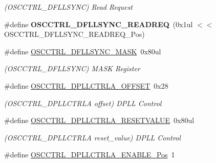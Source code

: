 \begin{DoxyCompactItemize}
\begin{DoxyCompactList}\small\item\em (O\+S\+C\+C\+T\+R\+L\+\_\+\+D\+F\+L\+L\+S\+Y\+N\+C) Read Request \end{DoxyCompactList}\item 
\hypertarget{group___s_a_m_l21___o_s_c_c_t_r_l_ga199b69336fb216ba83faebf331a55239}{}\#define {\bfseries O\+S\+C\+C\+T\+R\+L\+\_\+\+D\+F\+L\+L\+S\+Y\+N\+C\+\_\+\+R\+E\+A\+D\+R\+E\+Q}~(0x1ul $<$$<$ O\+S\+C\+C\+T\+R\+L\+\_\+\+D\+F\+L\+L\+S\+Y\+N\+C\+\_\+\+R\+E\+A\+D\+R\+E\+Q\+\_\+\+Pos)\label{group___s_a_m_l21___o_s_c_c_t_r_l_ga199b69336fb216ba83faebf331a55239}

\item 
\hypertarget{group___s_a_m_l21___o_s_c_c_t_r_l_gafd97d4fa228e779e98b8706cd34934c2}{}\#define \hyperlink{group___s_a_m_l21___o_s_c_c_t_r_l_gafd97d4fa228e779e98b8706cd34934c2}{O\+S\+C\+C\+T\+R\+L\+\_\+\+D\+F\+L\+L\+S\+Y\+N\+C\+\_\+\+M\+A\+S\+K}~0x80ul\label{group___s_a_m_l21___o_s_c_c_t_r_l_gafd97d4fa228e779e98b8706cd34934c2}

\begin{DoxyCompactList}\small\item\em (O\+S\+C\+C\+T\+R\+L\+\_\+\+D\+F\+L\+L\+S\+Y\+N\+C) M\+A\+S\+K Register \end{DoxyCompactList}\item 
\hypertarget{group___s_a_m_l21___o_s_c_c_t_r_l_ga37a4733b04ee101902f2512b99059cd5}{}\#define \hyperlink{group___s_a_m_l21___o_s_c_c_t_r_l_ga37a4733b04ee101902f2512b99059cd5}{O\+S\+C\+C\+T\+R\+L\+\_\+\+D\+P\+L\+L\+C\+T\+R\+L\+A\+\_\+\+O\+F\+F\+S\+E\+T}~0x28\label{group___s_a_m_l21___o_s_c_c_t_r_l_ga37a4733b04ee101902f2512b99059cd5}

\begin{DoxyCompactList}\small\item\em (O\+S\+C\+C\+T\+R\+L\+\_\+\+D\+P\+L\+L\+C\+T\+R\+L\+A offset) D\+P\+L\+L Control \end{DoxyCompactList}\item 
\hypertarget{group___s_a_m_l21___o_s_c_c_t_r_l_ga1753de286cb86ad6e147893f3413bd61}{}\#define \hyperlink{group___s_a_m_l21___o_s_c_c_t_r_l_ga1753de286cb86ad6e147893f3413bd61}{O\+S\+C\+C\+T\+R\+L\+\_\+\+D\+P\+L\+L\+C\+T\+R\+L\+A\+\_\+\+R\+E\+S\+E\+T\+V\+A\+L\+U\+E}~0x80ul\label{group___s_a_m_l21___o_s_c_c_t_r_l_ga1753de286cb86ad6e147893f3413bd61}

\begin{DoxyCompactList}\small\item\em (O\+S\+C\+C\+T\+R\+L\+\_\+\+D\+P\+L\+L\+C\+T\+R\+L\+A reset\+\_\+value) D\+P\+L\+L Control \end{DoxyCompactList}\item 
\hypertarget{group___s_a_m_l21___o_s_c_c_t_r_l_ga0b469beaddd68ce9ea7fca6c05e9ada5}{}\#define \hyperlink{group___s_a_m_l21___o_s_c_c_t_r_l_ga0b469beaddd68ce9ea7fca6c05e9ada5}{O\+S\+C\+C\+T\+R\+L\+\_\+\+D\+P\+L\+L\+C\+T\+R\+L\+A\+\_\+\+E\+N\+A\+B\+L\+E\+\_\+\+Pos}~1\label{group___s_a_m_l21___o_s_c_c_t_r_l_ga0b469beaddd68ce9ea7fca6c05e9ada5}


\end{DoxyCompactItemize}
